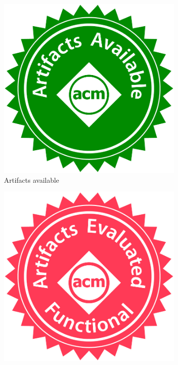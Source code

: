 \documentclass[logo,msc]{infthesis}           %
\begin{document}
\begin{figure}
     \centering
     \begin{subfigure}[t]{0.3\columnwidth}
         \centering
         \includegraphics[width=\textwidth]{assets/artifacts_available.jpg}
         \caption{Artifacts available}
         \label{fig:y equals x}
     \end{subfigure}
     \hfill
     \begin{subfigure}[t]{0.3\columnwidth}
         \centering
         \includegraphics[width=\textwidth]{assets/artifacts_evaluated_functional.jpg}

\end{subfigure}
\end{figure}
\end{document}
